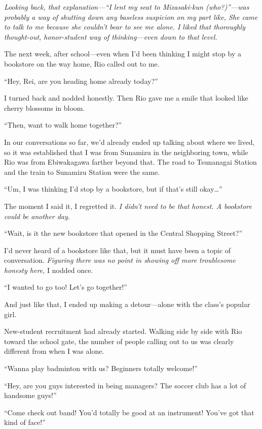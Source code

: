 \documentclass[
    a4paper,
    12pt,
    twoside,
    openany,
    UTF8,
    fontset=windows
]{ctexbook}
\begin{document}
\textit{Looking back, that explanation---``I lent my seat to Mizasaki-kun (who?)''---was probably a way of shutting down any baseless suspicion on my part like, She came to talk to me because she couldn't bear to see me alone. I liked that thoroughly thought-out, honor-student way of thinking---even down to that level.}

The next week, after school---even when I'd been thinking I might stop by a bookstore on the way home, Rio called out to me.

``Hey, Rei, are you heading home already today?''

I turned back and nodded honestly. Then Rio gave me a smile that looked like cherry blossoms in bloom.

``Then, want to walk home together?''

In our conversations so far, we'd already ended up talking about where we lived, so it was established that I was from Sunamizu in the neighboring town, while Rio was from Ebiwakagawa farther beyond that. The road to Tsunanagai Station and the train to Sunamizu Station were the same.

``Um, I was thinking I'd stop by a bookstore, but if that's still okay\dots''

The moment I said it, I regretted it. \textit{I didn't need to be that honest. A bookstore could be another day.}

``Wait, is it the new bookstore that opened in the Central Shopping Street?''

I'd never heard of a bookstore like that, but it must have been a topic of conversation. \textit{Figuring there was no point in showing off more troublesome honesty here,} I nodded once.

``I wanted to go too! Let's go together!''

And just like that, I ended up making a detour---alone with the class's popular girl.

New-student recruitment had already started. Walking side by side with Rio toward the school gate, the number of people calling out to us was clearly different from when I was alone.

``Wanna play badminton with us? Beginners totally welcome!''

``Hey, are you guys interested in being managers? The soccer club has a lot of handsome guys!''

``Come check out band! You'd totally be good at an instrument! You've got that kind of face!''
\end{document}
